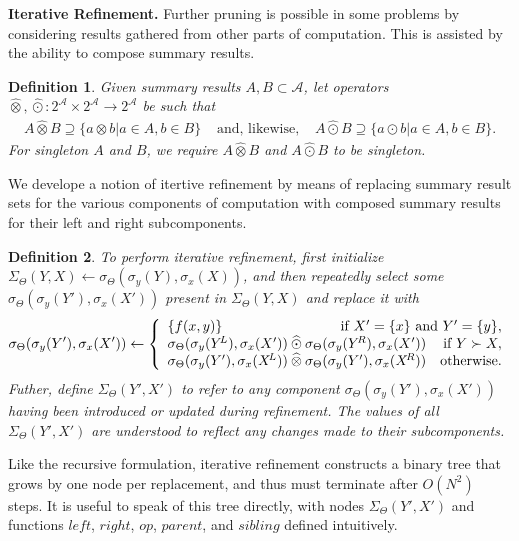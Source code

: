 \documentclass{article}
\newtheorem{definition} {Definition}
\newcommand{\GNP}[1][\psi]{{#1}_{\Theta}}
\newcommand{\otimeshat}{\mathbin{\widehat{\otimes}}}
\newcommand{\odothat}{\mathbin{\widehat{\odot}}}
\begin{document}
{\bf Iterative Refinement.}  Further pruning is possible in some
problems by considering results gathered from other parts of
computation.  This is assisted by the ability to compose summary
results.
\begin{definition}
  Given summary results $A, B \subset \mathcal{A}$, let operators
  $\otimeshat, \odothat \colon 2^{\mathcal{A}} \times 2^{\mathcal{A}}
  \to 2^{\mathcal{A}}$ be such that
  \[ \begin{array}{rcl}
    A \otimeshat B \supseteq \{a \otimes b | a \in A, b \in B\} & \mbox{ and, likewise, } & A \odothat B \supseteq \{a \odot b | a \in A, b \in B\}.
  \end{array} \]
  For singleton $A$ and $B$, we require $A \otimeshat B$ and $A
  \odothat B$ to be singleton.
\end{definition}
\noindent We develope a notion of itertive refinement by means of
replacing summary result sets for the various components of
computation with composed summary results for their left and right
subcomponents.
\begin{definition}
  To perform {\em iterative refinement}, first initialize
  $\GNP[\Sigma](Y,X) \leftarrow
  \GNP[\sigma](\sigma_y(Y),\sigma_x(X))$, and then repeatedly select
  some $\GNP[\sigma](\sigma_y(Y'),\sigma_x(X'))$ present in
  $\GNP[\Sigma](Y,X)$ and replace it with
  \[
  \GNP[\sigma](\sigma_y(Y'),\sigma_x(X')) \leftarrow \left\{ \begin{array}{lrr}
    \{f(x,y)\} & \multicolumn{2}{r}{\mbox{if } X' = \{x\} \mbox{ and } Y' = \{y\},} \\
    \multicolumn{2}{l}{\GNP[\sigma](\sigma_y(Y^{\!L}),\sigma_x(X')) \odothat \GNP[\sigma](\sigma_y(Y^{\!R}),\sigma_x(X'))} & \mbox{if } Y \succ X, \\
    \multicolumn{2}{l}{\GNP[\sigma](\sigma_y(Y'),\sigma_x(X^{\!L})) \otimeshat \GNP[\sigma](\sigma_y(Y'),\sigma_x(X^{\!R}))} & \mbox{otherwise}.
  \end{array} \right.
  \]
  Futher, define $\GNP[\Sigma](Y',X')$ to refer to any component
  $\GNP[\sigma](\sigma_y(Y'),\sigma_x(X'))$ having been introduced or
  updated during refinement.  The values of all $\GNP[\Sigma](Y',X')$
  are understood to reflect any changes made to their subcomponents.
\end{definition}
\noindent Like the recursive formulation, iterative refinement
constructs a binary tree that grows by one node per replacement, and
thus must terminate after $O(N^2)$ steps.  It is useful to speak of
this tree directly, with nodes $\GNP[\Sigma](Y',X')$ and functions
$left$, $right$, $op$, $parent$, and $sibling$ defined intuitively.
\end{document}
